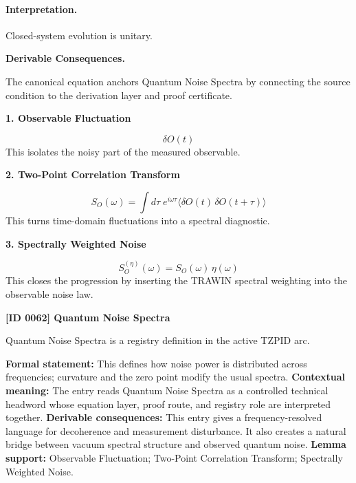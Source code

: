 \paragraph{Interpretation.}
Closed-system evolution is unitary.

\par\vspace{0.35em}
\noindent\textbf{Derivable Consequences.}\quad
\begingroup
\footnotesize
\raggedright
The canonical equation anchors Quantum Noise Spectra by connecting the source condition to the derivation layer and proof certificate.
\par\endgroup

\noindent\textbf{1. Observable Fluctuation}\par
\[
\delta O(t)
\]
\noindent This isolates the noisy part of the measured observable.\par
\noindent\textbf{2. Two-Point Correlation Transform}\par
\[
S_{O}(\omega)
=
\int d\tau\;
e^{i\omega\tau}
\langle \delta O(t)\,\delta O(t+\tau)\rangle
\]
\noindent This turns time-domain fluctuations into a spectral diagnostic.\par
\noindent\textbf{3. Spectrally Weighted Noise}\par
\[
S_{O}^{(\eta)}(\omega) = S_{O}(\omega)\,\eta(\omega)
\]
\noindent This closes the progression by inserting the TRAWIN spectral weighting into the observable noise law.\par

\clearpage
\noindent\textbf{[ID 0062] Quantum Noise Spectra}\par
\vspace{0.35em}
\begingroup\small
{}
Quantum Noise Spectra is a registry definition in the active TZPID arc.

\begingroup\footnotesize\setlength{\emergencystretch}{3em}\sloppy
\textbf{Formal statement:} This defines how noise power is distributed across frequencies; curvature and the zero point modify the usual spectra. \textbf{Contextual meaning:} The entry reads Quantum Noise Spectra as a controlled technical headword whose equation layer, proof route, and registry role are interpreted together. \textbf{Derivable consequences:} This entry gives a frequency-resolved language for decoherence and measurement disturbance. It also creates a natural bridge between vacuum spectral structure and observed quantum noise. \textbf{Lemma support:} Observable Fluctuation; Two-Point Correlation Transform; Spectrally Weighted Noise.\par
\endgroup

